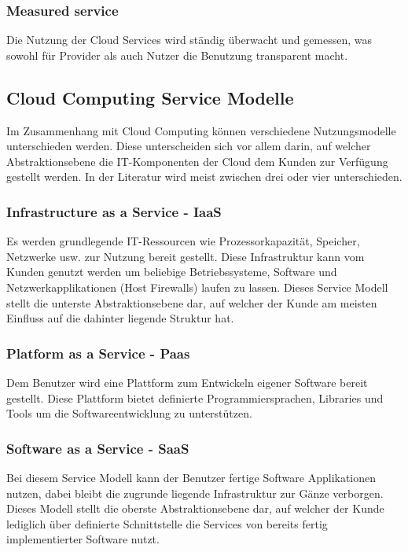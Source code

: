 \documentclass[a4paper,11pt]{article}
\begin{document}
\subsubsection{Measured service}
Die Nutzung der Cloud Services wird ständig überwacht und gemessen, was sowohl für Provider als auch Nutzer die Benutzung transparent macht.

\subsection{Cloud Computing Service Modelle}
Im Zusammenhang mit Cloud Computing können verschiedene Nutzungsmodelle unterschieden werden. Diese unterscheiden sich vor allem darin, auf welcher Abstraktionsebene die IT-Komponenten der Cloud dem Kunden zur Verfügung gestellt werden. In der Literatur wird meist zwischen drei oder vier unterschieden.

\subsubsection{Infrastructure as a Service - IaaS}
Es werden grundlegende IT-Ressourcen wie Prozessorkapazität, Speicher, Netzwerke usw. zur Nutzung bereit gestellt. Diese Infrastruktur kann vom Kunden genutzt werden um beliebige Betriebssysteme, Software und Netzwerkapplikationen (Host Firewalls) laufen zu lassen. Dieses Service Modell stellt die unterste Abstraktionsebene dar, auf welcher der Kunde am meisten Einfluss auf die dahinter liegende Struktur hat.

\subsubsection{Platform as a Service - Paas}
Dem Benutzer wird eine Plattform zum Entwickeln eigener Software bereit gestellt. Diese Plattform bietet definierte Programmiersprachen, Libraries und Tools um die Softwareentwicklung zu unterstützen.

\subsubsection{Software as a Service - SaaS}
Bei diesem Service Modell kann der Benutzer fertige Software Applikationen nutzen, dabei bleibt die zugrunde liegende Infrastruktur zur Gänze verborgen. Dieses Modell stellt die oberste Abstraktionsebene dar, auf welcher der Kunde lediglich über definierte Schnittstelle die Services von bereits fertig implementierter Software nutzt.
\end{document}
